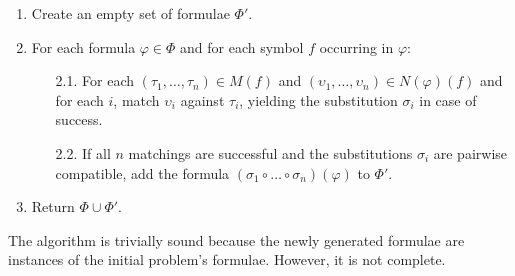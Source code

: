 \documentclass[runningheads]{llncs}
\begin{document}
\begin{enumerate}

   \item Create an empty set of formulae \(\Phi'\).

\pagebreak[2]

   \item For each formula \(\varphi \in \Phi\) and for each symbol \(f\) occurring in \(\varphi\):
   \begin{enumerate}
    \item[2.1.] For each \((\tau_1, \dots, \tau_n) \in  M(f)\) and \((\upsilon_1, \dots, \upsilon_n) \in N(\varphi)(f)\) and
     for each \(i\), match \(\upsilon_i\) against \(\tau_i\), yielding the substitution \(\sigma_i\) in case of success.

    \item[2.2.] If all \(n\) matchings are successful and the substitutions \(\sigma_i\) are pairwise compatible,
add the formula \((\sigma_1 \circ \dots \circ \sigma_n)(\varphi)\) to \(\Phi'\).
   \end{enumerate}

   \item Return \(\Phi \cup \Phi'\).

\end{enumerate}

The algorithm is trivially sound because the newly generated formulae are instances of the initial problem's formulae. %
However, it is not complete.
\end{document}
